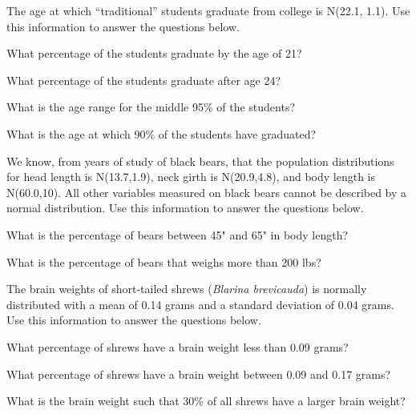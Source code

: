 \documentclass[10pt,openany]{book}\usepackage[]{graphicx}\usepackage[]{color}
\begin{document}
\begin{exsection}
  \item \label{revex:quNormStudentAge} The age at which ``traditional'' students graduate from college is N(22.1, 1.1).  Use this information to answer the questions below. 
\begin{Enumerate}
  \item What percentage of the students graduate by the age of 21?
  \item What percentage of the students graduate after age 24?
  \item What is the age range for the middle 95\% of the students?
  \item What is the age at which 90\% of the students have graduated?
\end{Enumerate}

  \item \label{revex:quNormBlackBears} We know, from years of study of black bears, that the population distributions for head length is N(13.7,1.9), neck girth is N(20.9,4.8), and body length is N(60.0,10). All other variables measured on black bears cannot be described by a normal distribution.  Use this information to answer the questions below. 
\begin{Enumerate}
  \item What is the percentage of bears between 45" and 65" in body length?
  \item What is the percentage of bears that weighs more than 200 lbs?
\end{Enumerate}

  \item \label{revex:quNormShrews} The brain weights of short-tailed shrews (\textit{Blarina brevicauda}) is normally distributed with a mean of 0.14 grams and a standard deviation of 0.04 grams. Use this information to answer the questions below. 
\begin{Enumerate}
  \item What percentage of shrews have a brain weight less than 0.09 grams?
  \item What percentage of shrews have a brain weight between 0.09 and 0.17 grams?
  \item What is the brain weight such that 30\% of all shrews have a larger brain weight?
\end{Enumerate}


\end{exsection}
\end{document}
